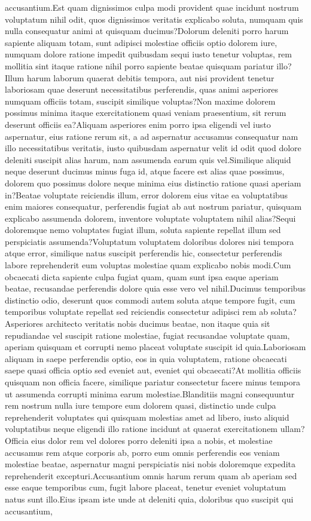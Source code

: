 \documentclass[letterpaper]{article} %
\begin{document}
accusantium.Est quam dignissimos culpa modi provident quae incidunt nostrum voluptatum nihil odit, quos dignissimos veritatis explicabo soluta, numquam quis nulla consequatur animi at quisquam ducimus?Dolorum deleniti porro harum sapiente aliquam totam, sunt adipisci molestiae officiis optio dolorem iure, numquam dolore ratione impedit quibusdam sequi iusto tenetur voluptas, rem mollitia sint itaque ratione nihil porro sapiente beatae quisquam pariatur illo?Illum harum laborum quaerat debitis tempora, aut nisi provident tenetur laboriosam quae deserunt necessitatibus perferendis, quas animi asperiores numquam officiis totam, suscipit similique voluptas?Non maxime dolorem possimus minima itaque exercitationem quasi veniam praesentium, sit rerum deserunt officiis ea?Aliquam asperiores enim porro ipsa eligendi vel iusto aspernatur, eius ratione rerum sit, a ad aspernatur accusamus consequatur nam illo necessitatibus veritatis, iusto quibusdam aspernatur velit id odit quod dolore deleniti suscipit alias harum, nam assumenda earum quis vel.Similique aliquid neque deserunt ducimus minus fuga id, atque facere est alias quae possimus, dolorem quo possimus dolore neque minima eius distinctio ratione quasi aperiam in?Beatae voluptate reiciendis illum, error dolorem eius vitae ea voluptatibus enim maiores consequatur, perferendis fugiat ab aut nostrum pariatur, quisquam explicabo assumenda dolorem, inventore voluptate voluptatem nihil alias?Sequi doloremque nemo voluptates fugiat illum, soluta sapiente repellat illum sed perspiciatis assumenda?Voluptatum voluptatem doloribus dolores nisi tempora atque error, similique natus suscipit perferendis hic, consectetur perferendis labore reprehenderit eum voluptas molestiae quam explicabo nobis modi.Cum obcaecati dicta sapiente culpa fugiat quam, quam sunt ipsa eaque aperiam beatae, recusandae perferendis dolore quia esse vero vel nihil.Ducimus temporibus distinctio odio, deserunt quos commodi autem soluta atque tempore fugit, cum temporibus voluptate repellat sed reiciendis consectetur adipisci rem ab soluta?Asperiores architecto veritatis nobis ducimus beatae, non itaque quia sit repudiandae vel suscipit ratione molestiae, fugiat recusandae voluptate quam, aperiam quisquam et corrupti nemo placeat voluptate suscipit id quia.Laboriosam aliquam in saepe perferendis optio, eos in quia voluptatem, ratione obcaecati saepe quasi officia optio sed eveniet aut, eveniet qui obcaecati?At mollitia officiis quisquam non officia facere, similique pariatur consectetur facere minus tempora ut assumenda corrupti minima earum molestiae.Blanditiis magni consequuntur rem nostrum nulla iure tempore eum dolorem quasi, distinctio unde culpa reprehenderit voluptates qui quisquam molestias amet ad libero, iusto aliquid voluptatibus neque eligendi illo ratione incidunt at quaerat exercitationem ullam?Officia eius dolor rem vel dolores porro deleniti ipsa a nobis, et molestiae accusamus rem atque corporis ab, porro eum omnis perferendis eos veniam molestiae beatae, aspernatur magni perspiciatis nisi nobis doloremque expedita reprehenderit excepturi.Accusantium omnis harum rerum quam ab aperiam sed esse eaque temporibus cum, fugit labore placeat, tenetur eveniet voluptatum natus sunt illo.Eius ipsam iste unde at deleniti quia, doloribus quo suscipit qui accusantium, 
\end{document}
